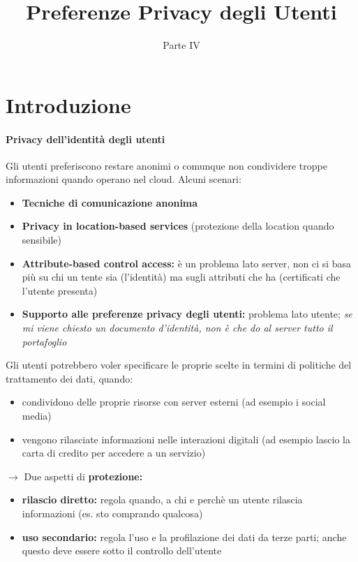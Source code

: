 \documentclass{report}
\title{Preferenze Privacy degli Utenti}
\date{Parte IV}
\begin{document}
\maketitle

\tableofcontents
\newpage

\chapter{Introduzione}
\subsubsection{Privacy dell'identità degli utenti}
Gli utenti preferiscono restare anonimi o comunque non condividere troppe informazioni quando
operano nel cloud.
Alcuni scenari:
\begin{itemize}
    \item \textbf{Tecniche di comunicazione anonima}
    \item \textbf{Privacy in location-based services} (protezione della location quando sensibile)
    \item \textbf{Attribute-based control access:} è un problema lato server, non ci si basa più su chi un tente sia (l'identità)
        ma sugli attributi che ha (certificati che l'utente presenta)
    \item \textbf{Supporto alle preferenze privacy degli utenti:} problema lato utente; \textit{se mi viene chiesto un documento d'identità, non è che do al server tutto il portafoglio}
\end{itemize}

\noindent Gli utenti potrebbero voler specificare le proprie scelte in termini di politiche del trattamento dei dati, quando:
\begin{itemize}
    \item condividono delle proprie risorse con server esterni (ad esempio i social media)
    \item vengono rilasciate informazioni nelle interazioni digitali (ad esempio lascio la carta di credito per accedere a un servizio)
\end{itemize}

$\rightarrow$ Due aspetti di \textbf{protezione:}
\begin{itemize}
    \item \textbf{rilascio diretto:} regola quando, a chi e perchè un utente rilascia informazioni (es. sto comprando qualcosa)
    \item \textbf{uso secondario:} regola l'uso e la profilazione dei dati da terze parti; anche questo deve essere sotto il controllo dell'utente
\end{itemize}
\end{document}
